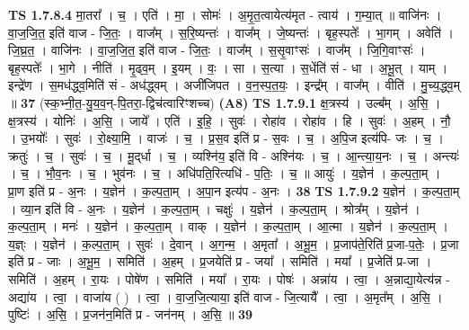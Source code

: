 \documentclass[17pt]{extarticle}
\begin{document}
                  \newline
                                \textbf{ TS 1.7.8.4} \newline
                  मा॒तरा᳚ । च॒ । एति॑ । मा॒ । सोमः॑ । अ॒मृ॒त॒त्वायेत्य॑मृत - त्वाय॑ । ग॒म्या॒त् ॥ वाजि॑नः । वा॒ज॒जि॒त॒ इति॑ वाज - जि॒तः॒ । वाज᳚म् । स॒रि॒ष्यन्तः॑ । वाज᳚म् । जे॒ष्यन्तः॑ । बृह॒स्पतेः᳚ । भा॒गम् । अवेति॑ । जि॒घ्र॒त॒ । वाजि॑नः । वा॒ज॒जि॒त॒ इति॑ वाज - जि॒तः॒ । वाज᳚म् । स॒सृ॒वाꣳसः॑ । वाज᳚म् । जि॒गि॒वाꣳसः॑ । बृह॒स्पतेः᳚ । भा॒गे । नीति॑ । मृ॒ढ्व॒म् । इ॒यम् । वः॒ । सा । स॒त्या । स॒धेंति॑ सं - धा । अ॒भू॒त् । याम् । इन्द्रे॑ण । स॒मध॑द्ध्व॒मिति॑ सं - अध॑द्ध्वम् । अजी॑जिपत । व॒न॒स्प॒त॒यः॒ । इन्द्र᳚म् । वाज᳚म् । वीति॑ । मु॒च्य॒द्ध्व॒म् ॥ \textbf{  37} \newline
                  \newline
                      (स्क॒भ्नी॒त॒-यु॒य॒व॒न्-पि॒तरा॒-द्विच॑त्वारिꣳशच्च)  \textbf{(A8)} \newline \newline
                                \textbf{ TS 1.7.9.1} \newline
                  क्ष॒त्रस्य॑ । उल्ब᳚म् । अ॒सि॒ । क्ष॒त्रस्य॑ । योनिः॑ । अ॒सि॒ । जाये᳚ । एति॑ । इ॒हि॒ । सुवः॑ । रोहा॑व । रोहा॑व । हि । सुवः॑ । अ॒हम् । नौ॒ । उ॒भयोः᳚ । सुवः॑ । रो॒क्ष्या॒मि॒ । वाजः॑ । च॒ । प्र॒स॒व इति॑ प्र - स॒वः । च॒ । अ॒पि॒ज इत्य॑पि- जः । च॒ । क्रतुः॑ । च॒ । सुवः॑ । च॒ । मू॒द्‌र्धा । च॒ । व्यश्नि॑य॒ इति॑ वि - अश्नि॑यः । च॒ । आ॒न्त्या॒य॒नः । च॒ । अन्त्यः॑ । च॒ । भौ॒व॒नः । च॒ । भुव॑नः । च॒ । अधि॑पति॒रित्यधि॑ - प॒तिः॒ । च॒ ॥ आयुः॑ । य॒ज्ञेन॑ । क॒ल्प॒ता॒म् । प्रा॒ण इति॑ प्र - अ॒नः । य॒ज्ञेन॑ । क॒ल्प॒ता॒म् । अ॒पा॒न इत्य॑प - अ॒नः । \textbf{  38} \newline
                  \newline
                                \textbf{ TS 1.7.9.2} \newline
                  य॒ज्ञेन॑ । क॒ल्प॒ता॒म् । व्या॒न इति॑ वि - अ॒नः । य॒ज्ञेन॑ । क॒ल्प॒ता॒म् । चक्षुः॑ । य॒ज्ञेन॑ । क॒ल्प॒ता॒म् । श्रोत्र᳚म् । य॒ज्ञेन॑ । क॒ल्प॒ता॒म् । मनः॑ । य॒ज्ञेन॑ । क॒ल्प॒ता॒म् । वाक् । य॒ज्ञेन॑ । क॒ल्प॒ता॒म् । आ॒त्मा । य॒ज्ञेन॑ । क॒ल्प॒ता॒म् । य॒ज्ञ्ः । य॒ज्ञेन॑ । क॒ल्प॒ता॒म् । सुवः॑ । दे॒वान् । अ॒ग॒न्म॒ । अ॒मृता᳚ । अ॒भू॒म॒ । प्र॒जाप॑ते॒रिति॑ प्र॒जा-प॒तेः॒ । प्र॒जा इति॑ प्र - जाः । अ॒भू॒म॒ । समिति॑ । अ॒हम् । प्र॒जयेति॑ प्र - जया᳚ । समिति॑ । मया᳚ । प्र॒जेति॑ प्र-जा । समिति॑ । अ॒हम् । रा॒यः । पोषे॑ण । समिति॑ । मया᳚ । रा॒यः । पोषः॑ । अन्ना॑य । त्वा॒ । अ॒न्नाद्या॒येत्य॑न्न - अद्या॑य । त्वा॒ । वाजा॑य ( ) । त्वा॒ । वा॒ज॒जि॒त्याया॒ इति॑ वाज - जि॒त्यायै᳚ । त्वा॒ । अ॒मृत᳚म् । अ॒सि॒ । पुष्टिः॑ । अ॒सि॒ । प्र॒जन॑न॒मिति॑ प्र - जन॑नम् । अ॒सि॒ ॥ \textbf{  39 } \newline
\end{document}
